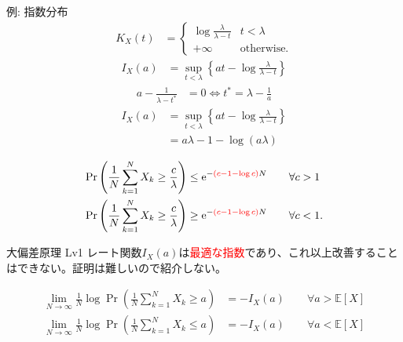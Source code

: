\documentclass[lualatex,handout]{beamer}
\newcommand{\emm}[1]{\textcolor{red}{#1}}
\newcommand{\expt}[1]{\mathbb{E}\left[#1\right]}
\theoremstyle{definition}
\begin{document}
\begin{frame}{例: 指数分布}
\small
\begin{align*}
K_X(t) &=
\begin{cases}
\log\frac{\lambda}{\lambda-t}& t < \lambda\\
+\infty&\text{otherwise.}
\end{cases}
\end{align*}
\begin{align*}
I_X(a) &= \sup_{t<\lambda} \left\{at - \log\frac{\lambda}{\lambda-t}\right\}
\end{align*}
\begin{align*}
a - \frac1{\lambda-t^*} &=0 \iff  t^* = \lambda-\frac1a
\end{align*}
\begin{align*}
I_X(a) &= \sup_{t<\lambda} \left\{at - \log\frac{\lambda}{\lambda-t}\right\}\\
&=
a\lambda - 1 - \log(a\lambda)
\end{align*}

\begin{align*}
\Pr\left(\frac1N\sum_{k=1}^N X_k \ge \frac{c}{\lambda}\right) &\le \mathrm{e}^{-\emm{(c-1-\log c)}N} \qquad\forall c>1\\
\Pr\left(\frac1N\sum_{k=1}^N X_k \ge \frac{c}{\lambda}\right) &\ge \mathrm{e}^{-\emm{(c-1-\log c)}N} \qquad\forall c<1.
\end{align*}
\end{frame}


\begin{frame}{大偏差原理 Lv1}
レート関数$I_X(a)$は\emm{最適な指数}であり、これ以上改善することはできない。証明は難しいので紹介しない。
\begin{theorem}[クラメールの定理]
\begin{align*}
\lim_{N\to\infty}\frac1N \log \Pr\left(\frac1N\sum_{k=1}^N X_k \ge a\right) &= -I_X(a) \qquad\forall a>\expt{X}\\
\lim_{N\to\infty}\frac1N \log \Pr\left(\frac1N\sum_{k=1}^N X_k \le a\right) &= -I_X(a) \qquad\forall a<\expt{X}
\end{align*}
\end{theorem}
\end{frame}
\end{document}
